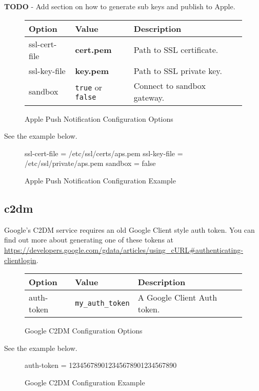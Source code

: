 \documentclass[12pt]{article}
\newcommand{\file}[1]{{\bf\ttfamily #1}}
\begin{document}
\textbf{TODO} - Add section on how to generate sub keys and publish to Apple.

\begin{figure}[h!]
\centering
\begin{tabular}{l l l}
\hline
Option & Value & Description \\
\hline
ssl-cert-file & \file{cert.pem} & Path to SSL certificate. \\
ssl-key-file & \file{key.pem} & Path to SSL private key. \\
sandbox & \verb|true| or \verb|false| & Connect to sandbox gateway. \\
\hline
\end{tabular}
\caption{Apple Push Notification Configuration Options}
\end{figure}

See the example below.

\begin{figure}[h!]
\begin{Terminal}
[aps]
ssl-cert-file = /etc/ssl/certs/aps.pem
ssl-key-file = /etc/ssl/private/aps.pem
sandbox = false
\end{Terminal}
\caption{Apple Push Notification Configuration Example}
\end{figure}

\subsection{c2dm}

Google's C2DM service requires an old Google Client style auth token.
You can find out more about generating one of these tokens at \url{https://developers.google.com/gdata/articles/using_cURL#authenticating-clientlogin}.

\begin{figure}[h!]
\centering
\begin{tabular}{l l l}
\hline
Option & Value & Description \\
\hline
auth-token & \verb|my_auth_token| & A Google Client Auth token. \\
\hline
\end{tabular}
\caption{Google C2DM Configuration Options}
\end{figure}

See the example below.

\begin{figure}[h!]
\begin{Terminal}
[c2dm]
auth-token = 123456789012345678901234567890
\end{Terminal}
\caption{Google C2DM Configuration Example}
\end{figure}
\end{document}

